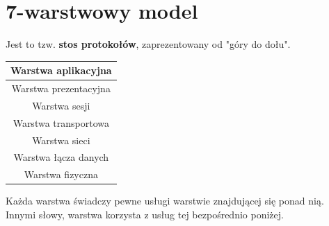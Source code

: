 	\section{7-warstwowy model}
		Jest to tzw. \textbf{stos protokołów}, zaprezentowany od "góry do dołu".
		\begin{table}[h]
			\begin{tabular}{|c|}
				\hline
				Warstwa aplikacyjna	\\ \hline
				Warstwa prezentacyjna	\\ \hline
				Warstwa sesji		\\ \hline
				Warstwa transportowa		\\ \hline
				Warstwa sieci	\\ \hline
				Warstwa łącza danych		\\ \hline
				Warstwa fizyczna \\ \hline
			\end{tabular}
		\end{table}
		Każda warstwa świadczy pewne usługi warstwie znajdującej się ponad nią. Innymi słowy, warstwa korzysta z usług tej bezpośrednio poniżej.
